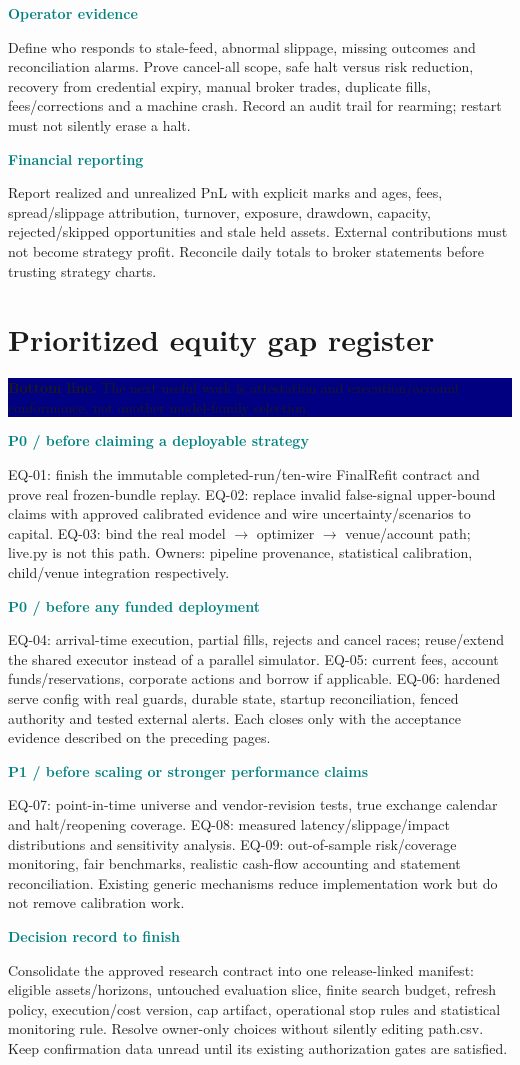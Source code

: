 \documentclass[10pt,letterpaper]{article}
\newcommand{\bl}[1]{\noindent\colorbox{navy}{\parbox{\dimexpr\linewidth-2\fboxsep}{\color{white}\textbf{Bottom line.} #1}}\par\medskip}
\newcommand{\topic}[2]{\clearpage\section{#1}\bl{#2}}
\newcommand{\sub}[1]{\par\textbf{\textcolor{teal}{#1}}\par}
\begin{document}
\sub{Operator evidence}
Define who responds to stale-feed, abnormal slippage, missing outcomes and reconciliation alarms. Prove cancel-all scope, safe halt versus risk reduction, recovery from credential expiry, manual broker trades, duplicate fills, fees/corrections and a machine crash. Record an audit trail for rearming; restart must not silently erase a halt.
\sub{Financial reporting}
Report realized and unrealized PnL with explicit marks and ages, fees, spread/slippage attribution, turnover, exposure, drawdown, capacity, rejected/skipped opportunities and stale held assets. External contributions must not become strategy profit. Reconcile daily totals to broker statements before trusting strategy charts.
\topic{Prioritized equity gap register}{The next useful work is attestation and execution/account conformance, not another model-family selection.}
\sub{P0 / before claiming a deployable strategy}
EQ-01: finish the immutable completed-run/ten-wire FinalRefit contract and prove real frozen-bundle replay. EQ-02: replace invalid false-signal upper-bound claims with approved calibrated evidence and wire uncertainty/scenarios to capital. EQ-03: bind the real model $\rightarrow$ optimizer $\rightarrow$ venue/account path; live.py is not this path. Owners: pipeline provenance, statistical calibration, child/venue integration respectively.
\sub{P0 / before any funded deployment}
EQ-04: arrival-time execution, partial fills, rejects and cancel races; reuse/extend the shared executor instead of a parallel simulator. EQ-05: current fees, account funds/reservations, corporate actions and borrow if applicable. EQ-06: hardened serve config with real guards, durable state, startup reconciliation, fenced authority and tested external alerts. Each closes only with the acceptance evidence described on the preceding pages.
\sub{P1 / before scaling or stronger performance claims}
EQ-07: point-in-time universe and vendor-revision tests, true exchange calendar and halt/reopening coverage. EQ-08: measured latency/slippage/impact distributions and sensitivity analysis. EQ-09: out-of-sample risk/coverage monitoring, fair benchmarks, realistic cash-flow accounting and statement reconciliation. Existing generic mechanisms reduce implementation work but do not remove calibration work.
\sub{Decision record to finish}
Consolidate the approved research contract into one release-linked manifest: eligible assets/horizons, untouched evaluation slice, finite search budget, refresh policy, execution/cost version, cap artifact, operational stop rules and statistical monitoring rule. Resolve owner-only choices without silently editing path.csv. Keep confirmation data unread until its existing authorization gates are satisfied.
\end{document}
